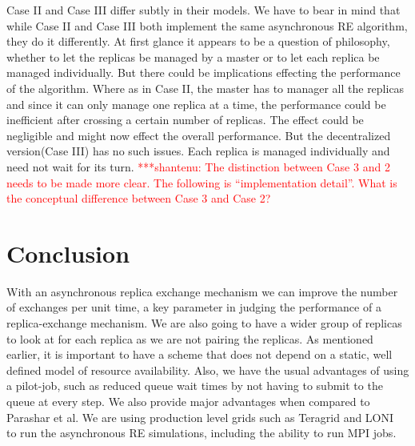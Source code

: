 \documentclass[a4paper,10pt]{article}
\newcommand{\jhanote}[1]{ {\textcolor{red} { ***shantenu: #1 }}}
\newcommand{\athotanote}[1]{ {\textcolor{green} { ***athota: #1 }}}
\newcommand{\jhanote}[1]{}
\newcommand{\athotanote}[1]{}
\begin{document}
Case II and Case III differ subtly in their models. We have to bear in mind that while Case II and Case III both implement the same asynchronous RE algorithm, they do it differently. At first glance it appears to be a question of philosophy, whether to let the replicas be managed by a master or to let each replica be managed individually. But there could be implications effecting the performance of the algorithm. Where as in Case II, the master has to manager all the replicas and since it can only manage one replica at a time, the performance could be inefficient after crossing a certain number of replicas. The effect could be negligible and might now effect the overall performance. But the decentralized version(Case III) has no such issues. Each replica is managed individually and need not wait for its turn.
\jhanote{The distinction between
  Case 3 and 2 needs to be made more clear. The following is
  ``implementation detail''. What is the conceptual difference between
  Case 3 and Case 2?} 
  

\section{Conclusion}
With an asynchronous replica exchange mechanism we can improve the number of exchanges per unit time, 
a key parameter in judging the performance of a replica-exchange mechanism. %
We are also going to have a wider group of replicas to look at for each replica as we are not pairing 
the replicas. As mentioned earlier, it is important to have a scheme that does not depend on a static, well defined model of resource availability. Also, we have the usual advantages of using a pilot-job, such as reduced queue wait 
times by not having to submit to the queue at every step. 
We also provide major advantages when compared to Parashar et al. We are using production level grids such as Teragrid and LONI~\cite{LONI_web} to run the asynchronous RE simulations, including the ability to run MPI jobs. %
\end{document}
